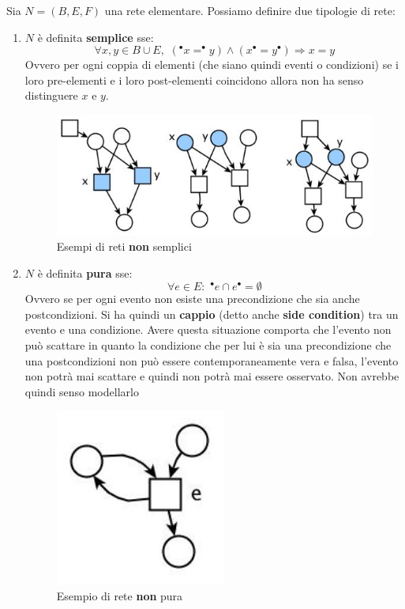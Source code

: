 \documentclass[a4paper,12pt, oneside]{book}
\begin{document}
\begin{definizione}
  Sia $N=(B,E,F)$ una rete elementare. Possiamo definire due tipologie di rete:
  \begin{enumerate}
    \item $N$ è definita \textbf{semplice} sse:
    \[\forall x,y \in B\cup E,\,\, (^\bullet x = ^\bullet y)\wedge (x^\bullet =
      y^\bullet)\Rightarrow x = y\]
    Ovvero per ogni coppia di elementi (che siano quindi eventi o condizioni) se
    i loro pre-elementi e i loro post-elementi coincidono allora non ha senso
    distinguere $x$ e $y$.
    \begin{figure}[H]
      \centering
      \includegraphics[scale = 0.5]{img/sem.jpg}
      \caption{Esempi di reti \textbf{non} semplici}
    \end{figure}
    \newpage
    \item $N$ è definita \textbf{pura} sse:
    \[\forall e \in E:\,\,^\bullet e \cap e^\bullet = \emptyset\]
    Ovvero se per ogni evento non esiste una precondizione che sia anche
    postcondizioni. Si ha quindi un \textbf{cappio} (detto anche \textbf{side
      condition}) tra un evento e una condizione. Avere questa situazione
    comporta che l'evento non può scattare in quanto la condizione che per lui è
    sia una precondizione che una postcondizioni non può essere
    contemporaneamente vera e falsa, l'evento non potrà mai scattare e quindi
    non potrà mai essere osservato. Non avrebbe quindi senso modellarlo
    \begin{figure}[H]
      \centering
      \includegraphics[scale = 0.5]{img/pura.jpg}
      \caption{Esempio di rete \textbf{non} pura}
    \end{figure}
  \end{enumerate}
\end{definizione}
\end{document}
